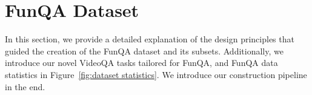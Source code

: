 \section{FunQA Dataset}


In this section, we provide a detailed explanation of the design principles that guided the creation of the FunQA dataset and its subsets. Additionally, we introduce our novel VideoQA tasks tailored for FunQA, and FunQA data statistics in Figure~\ref{fig:dataset statistics}. We introduce our construction pipeline in the end.


